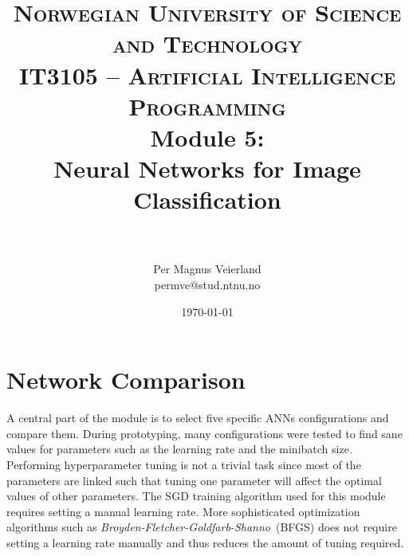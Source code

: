 

\usepackage{float}
\usepackage{tabularx}

\title{
\normalfont \normalsize
\textsc{Norwegian University of Science and Technology\\IT3105 -- Artificial Intelligence Programming}
\horrule{0.5pt} \\[0.4cm]
\huge Module 5:\\ Neural Networks for Image Classification\\
\horrule{2pt} \\[0.5cm]
}

\author{Per Magnus Veierland\\permve@stud.ntnu.no}

\date{\normalsize\today}

\pgfplotsset{compat=1.5}





\fancyfoot[C]{}
\maketitle

\newpage
{} %
\setcounter{page}{1}

\section*{Network Comparison}

A central part of the module is to select five specific \acp{ANN} configurations and compare them. During prototyping, many configurations were tested to find sane values for parameters such as the learning rate and the minibatch size. Performing hyperparameter tuning is not a trivial task since most of the parameters are linked such that tuning one parameter will affect the optimal values of other parameters. The \ac{SGD} training algorithm used for this module requires setting a manual learning rate. More sophisticated optimization algorithms such as \textit{Broyden-Fletcher-Goldfarb-Shanno}~(BFGS) does not require setting a learning rate manually and thus reduces the amount of tuning required.


